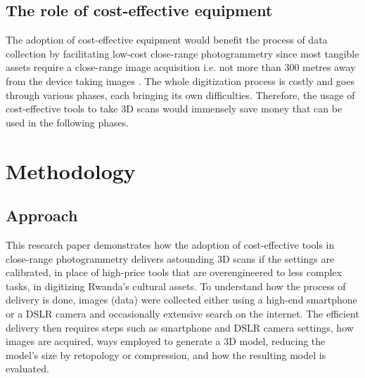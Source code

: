 \documentclass[conference]{IEEEtran}
\begin{document}
\subsection{\textbf{The role of cost-effective equipment}}

The adoption of cost-effective equipment would benefit the process of data collection by facilitating low-cost close-range photogrammetry since most tangible assets require a close-range image acquisition i.e. not more than 300 metres away from the device taking images \cite{cls_ran}. The whole digitization process is costly and goes through various phases, each bringing its own difficulties. Therefore, the usage of cost-effective tools to take 3D scans would immensely save money that can be used in the following phases.

\section{\textbf{Methodology}}
\subsection{Approach}


This research paper demonstrates how the adoption of cost-effective tools in close-range photogrammetry delivers astounding 3D scans if the settings are calibrated, in place of high-price tools that are overengineered to less complex tasks, in digitizing Rwanda’s cultural assets. To understand how the process of delivery is done, images (data) were collected either using a high-end smartphone or a DSLR camera and occasionally extensive search on the internet. The efficient delivery then requires steps such as smartphone and DSLR camera settings, how images are acquired, ways employed to generate a 3D model, reducing the model’s size by retopology or compression, and how the resulting model is evaluated.
\end{document}
